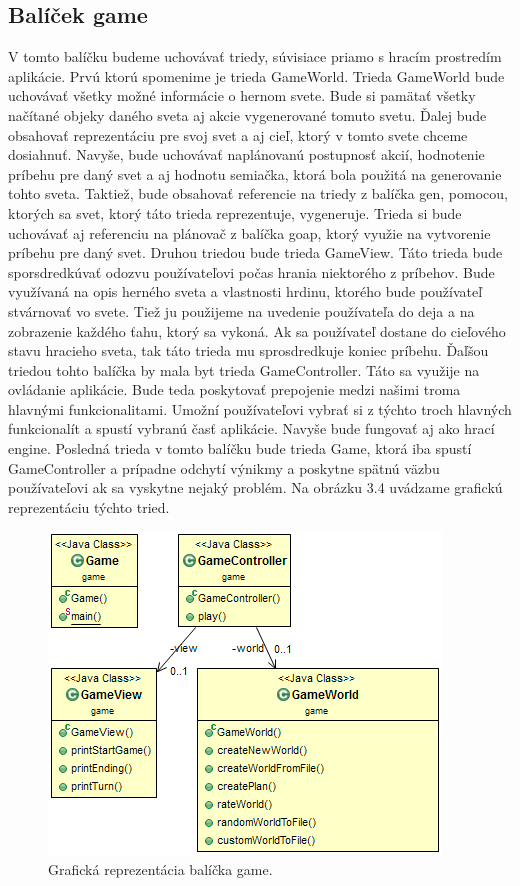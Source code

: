 \subsection{Balíček game}
V tomto balíčku budeme uchovávať triedy, súvisiace priamo s hracím prostredím aplikácie. Prvú ktorú spomenime je trieda GameWorld. Trieda GameWorld bude uchovávať všetky možné informácie o hernom svete. Bude si pamätať všetky načítané objeky daného sveta aj akcie vygenerované tomuto svetu. Ďalej bude obsahovať reprezentáciu pre svoj svet a aj cieľ, ktorý v tomto svete chceme dosiahnuť. Navyše, bude uchovávať naplánovanú postupnosť akcií, hodnotenie príbehu pre daný svet a aj hodnotu semiačka, ktorá bola použitá na generovanie tohto sveta. Taktiež, bude obsahovať referencie na triedy z balíčka gen, pomocou, ktorých sa svet, ktorý táto trieda reprezentuje, vygeneruje. Trieda si bude uchovávať aj referenciu na plánovač z balíčka goap, ktorý využie na vytvorenie príbehu pre daný svet. Druhou triedou bude trieda GameView. Táto trieda bude sporsdredkúvať odozvu používateľovi počas hrania niektorého z príbehov. Bude využívaná na opis herného sveta a vlastnosti hrdinu, ktorého bude používateľ stvárnovať vo svete. Tiež ju použijeme na uvedenie používateľa do deja a na zobrazenie každého ťahu, ktorý sa vykoná. Ak sa používateľ dostane do cieľového stavu hracieho sveta, tak táto trieda mu sprosdredkuje koniec príbehu. Ďaľšou triedou tohto balíčka by mala byt trieda GameController. Táto sa využije na ovládanie aplikácie. Bude teda poskytovať prepojenie medzi našimi troma hlavnými funkcionalitami. Umožní používateľovi vybrať si z týchto troch hlavných funkcionalít a spustí vybranú časť aplikácie. Navyše bude fungovať aj ako hrací engine. Posledná trieda v tomto balíčku bude trieda Game, ktorá iba spustí GameController a prípadne odchytí výnikmy a poskytne spätnú väzbu používateľovi ak sa vyskytne nejaký problém. Na obrázku 3.4 uvádzame grafickú reprezentáciu týchto tried.
\begin{figure}[H] 
\begin{center}
\includegraphics[scale=0.9]{img/game.png}
\caption{Grafická reprezentácia balíčka game.}
\label{fig:ch34}
\end{center}
\end{figure}
